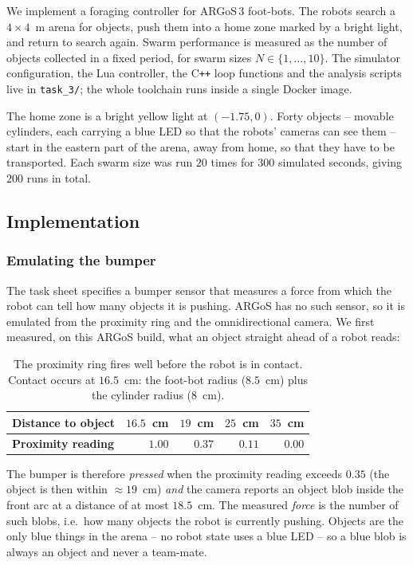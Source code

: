 \documentclass[12pt, a4paper]{article}
\begin{document}
We implement a foraging controller for ARGoS\,3 foot-bots.  The robots search a
$4 \times 4$~m arena for objects, push them into a home zone marked by a bright
light, and return to search again.  Swarm performance is measured as the number
of objects collected in a fixed period, for swarm sizes $N \in \{1, \dots, 10\}$.
The simulator configuration, the Lua controller, the C\texttt{++} loop functions
and the analysis scripts live in \texttt{task\_3/}; the whole toolchain runs
inside a single Docker image.

The home zone is a bright yellow light at $(-1.75, 0)$.  Forty objects --
movable cylinders, each carrying a blue LED so that the robots' cameras can see
them -- start in the eastern part of the arena, away from home, so that they
have to be transported.  Each swarm size was run $20$ times for $300$ simulated
seconds, giving $200$ runs in total.

\subsection{Implementation}

\subsubsection{Emulating the bumper}

The task sheet specifies a bumper sensor that measures a force from which the
robot can tell how many objects it is pushing.  ARGoS has no such sensor, so it
is emulated from the proximity ring and the omnidirectional camera.  We first
measured, on this ARGoS build, what an object straight ahead of a robot reads:

\begin{table}[h]
\centering
\begin{tabular}{lrrrr}
\toprule
\textbf{Distance to object} & $16.5$~cm & $19$~cm & $25$~cm & $35$~cm \\
\midrule
\textbf{Proximity reading}  & $1.00$    & $0.37$  & $0.11$  & $0.00$ \\
\bottomrule
\end{tabular}
\caption{The proximity ring fires well before the robot is in contact.  Contact
         occurs at $16.5$~cm: the foot-bot radius ($8.5$~cm) plus the cylinder
         radius ($8$~cm).}
\label{tab:prox}
\end{table}

The bumper is therefore \emph{pressed} when the proximity reading exceeds $0.35$
(the object is then within ${\approx}19$~cm) \emph{and} the camera reports an
object blob inside the front arc at a distance of at most $18.5$~cm.  The
measured \emph{force} is the number of such blobs, i.e.\ how many objects the
robot is currently pushing.  Objects are the only blue things in the arena --
no robot state uses a blue LED -- so a blue blob is always an object and never a
team-mate.
\end{document}
